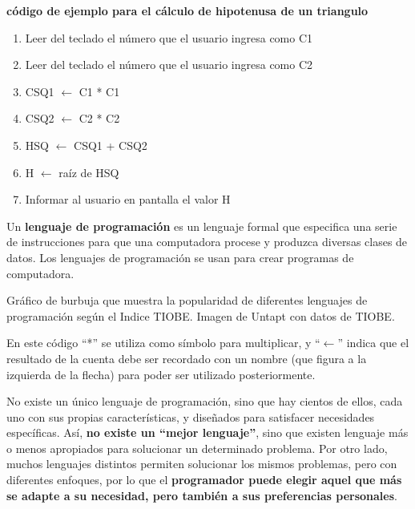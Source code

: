 \begin{example}
    \textbf{código de ejemplo para el cálculo de hipotenusa de un triangulo}

    \begin{enumerate}
        \item Leer del teclado el número que el usuario ingresa como C1
        \item Leer del teclado el número que el usuario ingresa como C2
        \item CSQ1 $\leftarrow$ C1 * C1
        \item CSQ2 $\leftarrow$ C2 * C2
        \item HSQ $\leftarrow$ CSQ1 + CSQ2
        \item H $\leftarrow$ raíz de HSQ
        \item Informar al usuario en pantalla el valor H
    \end{enumerate}
\end{example}

\begin{definition}
    Un \textbf{lenguaje de programación} es un lenguaje formal que especifica
    una serie de instrucciones para que una computadora procese y produzca diversas
    clases de datos. Los lenguajes de programación se usan para crear programas
    de computadora.\autocite{sebesta_2005}
\end{definition}

{Gráfico de burbuja que muestra la popularidad de diferentes lenguajes de programación
según el Indice TIOBE.}
{Imagen de Untapt con datos de TIOBE.}

En este código ``*'' se utiliza como símbolo para multiplicar, y ``$\leftarrow$''
indica que el resultado de la cuenta debe ser recordado con un nombre (que
figura a la izquierda de la flecha) para poder ser utilizado posteriormente.

No existe un único lenguaje de programación, sino que hay cientos de ellos, cada
uno con sus propias características, y diseñados para satisfacer necesidades
específicas. Así, \textbf{no existe un ``mejor lenguaje''}, sino que existen lenguaje
más o menos apropiados para solucionar un determinado problema. Por otro lado, muchos
lenguajes distintos permiten solucionar los mismos problemas, pero con diferentes
enfoques, por lo que el \textbf{programador puede elegir aquel que más se adapte a su
necesidad, pero también a sus preferencias personales}.

